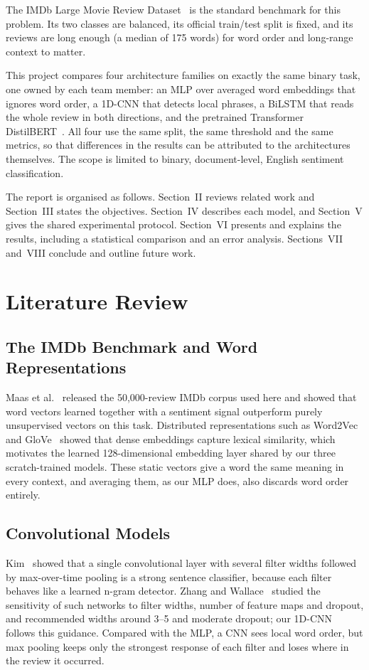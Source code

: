 \documentclass[conference,onecolumn,a4paper,10pt]{IEEEtran}
\begin{document}
The IMDb Large Movie Review Dataset~\cite{maas2011} is the standard benchmark for this problem. Its two classes are balanced, its official train/test split is fixed, and its reviews are long enough (a median of 175 words) for word order and long-range context to matter.

This project compares four architecture families on exactly the same binary task, one owned by each team member: an MLP over averaged word embeddings that ignores word order, a 1D-CNN that detects local phrases, a BiLSTM that reads the whole review in both directions, and the pretrained Transformer DistilBERT~\cite{sanh2019}. All four use the same split, the same threshold and the same metrics, so that differences in the results can be attributed to the architectures themselves. The scope is limited to binary, document-level, English sentiment classification.

The report is organised as follows. Section~II reviews related work and Section~III states the objectives. Section~IV describes each model, and Section~V gives the shared experimental protocol. Section~VI presents and explains the results, including a statistical comparison and an error analysis. Sections~VII and~VIII conclude and outline future work.

\section{Literature Review}

\subsection{The IMDb Benchmark and Word Representations}
Maas et al.~\cite{maas2011} released the 50,000-review IMDb corpus used here and showed that word vectors learned together with a sentiment signal outperform purely unsupervised vectors on this task. Distributed representations such as Word2Vec~\cite{mikolov2013} and GloVe~\cite{pennington2014} showed that dense embeddings capture lexical similarity, which motivates the learned 128-dimensional embedding layer shared by our three scratch-trained models. These static vectors give a word the same meaning in every context, and averaging them, as our MLP does, also discards word order entirely.

\subsection{Convolutional Models}
Kim~\cite{kim2014} showed that a single convolutional layer with several filter widths followed by max-over-time pooling is a strong sentence classifier, because each filter behaves like a learned n-gram detector. Zhang and Wallace~\cite{zhang2017} studied the sensitivity of such networks to filter widths, number of feature maps and dropout, and recommended widths around 3--5 and moderate dropout; our 1D-CNN follows this guidance. Compared with the MLP, a CNN sees local word order, but max pooling keeps only the strongest response of each filter and loses where in the review it occurred.
\end{document}
